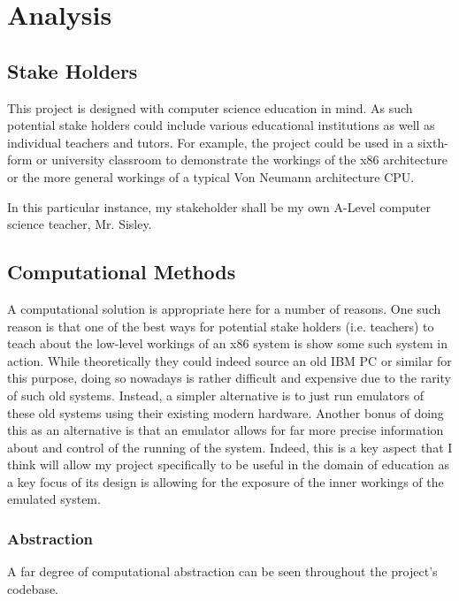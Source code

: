 \section{Analysis}

\subsection{Stake Holders}
    This project is designed with computer science education in mind. As such potential stake holders could include various educational institutions as well as individual teachers and tutors. For example, the project could be used in a sixth-form or university classroom to demonstrate the workings of the x86 architecture or the more general workings of a typical Von Neumann architecture CPU.

    In this particular instance, my stakeholder shall be my own A-Level computer science teacher, Mr. Sisley.

\subsection{Computational Methods}
    A computational solution is appropriate here for a number of reasons. One such reason is that one of the best ways for potential stake holders (i.e. teachers) to teach about the low-level workings of an x86 system is show some such system in action. While theoretically they could indeed source an old IBM PC or similar for this purpose, doing so nowadays is rather difficult and expensive due to the rarity of such old systems. Instead, a simpler alternative is to just run emulators of these old systems using their existing modern hardware. Another bonus of doing this as an alternative is that an emulator allows for far more precise information about and control of the running of the system. Indeed, this is a key aspect that I think will allow my project specifically to be useful in the domain of education as a key focus of its design is allowing for the exposure of the inner workings of the emulated system.

    \subsubsection{Abstraction}
        A far degree of computational abstraction can be seen throughout the project's codebase.

